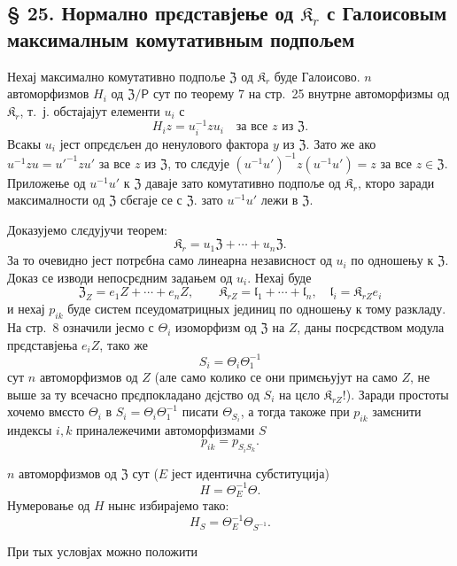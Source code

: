 \documentclass[11pt]{article}
\begin{document}
\subsection*{§ 25. Нормално прєдставјење од \(\mathfrak K_r\) с Галоисовым максималным комутативным подпољем\protect\footnotemark}
\label{normaldarstellung-von-r_r-mit-galoisschem-maximalem-kommutativem-teilkoerper-1}

Нехај максимално комутативно подпоље \(\mathfrak Z\) од \(\mathfrak K_r\) буде Галоисово. \(n\) автоморфизмов \(H_i\) од \(\mathfrak Z/\mathsf P\) сут по теорему 7 на стр.~25 внутрне автоморфизмы од \(\mathfrak K_r\), т.~ј. обстајајут елементи \(u_i\) с
\[
H_i z=u_i^{-1}zu_i\quad\text{за все }z\text{ из }\mathfrak Z.
\]
Всакы \(u_i\) јест опрєдєљен до ненулового фактора \(y\) из \(\mathfrak Z\). Зато же ако \(u^{-1}zu=u'^{-1}zu'\) за все \(z\) из \(\mathfrak Z\), то слєдује \((u^{-1}u')^{-1}z(u^{-1}u')=z\) за все \(z\in\mathfrak Z\). Приложење од \(u^{-1}u'\) к \(\mathfrak Z\) даваје зато комутативно подпоље од \(\mathfrak K_r\), кторо заради максималности од \(\mathfrak Z\) сбєгаје се с \(\mathfrak Z\). зато \(u^{-1}u'\) лежи в \(\mathfrak Z\).

Доказујемо слєдујучи теорем:
\[
\mathfrak K_r=u_1\mathfrak Z+\cdots+u_n\mathfrak Z.
\]
За то очевидно јест потрєбна само линеарна независност од \(u_i\) по одношењу к \(\mathfrak Z\). Доказ се изводи непосрєдним задањем од \(u_i\). Нехај буде
\[
\mathfrak Z_Z=e_1Z+\cdots+e_nZ,\qquad
\mathfrak K_{rZ}=\mathfrak l_1+\cdots+\mathfrak l_n,\quad
\mathfrak l_i=\mathfrak K_{rZ}e_i
\]
и нехај \(p_{ik}\) буде систем псеудоматрицных јединиц по одношењу к тому разкладу. На стр.~8 означили јесмо с \(\Theta_i\) изоморфизм од \(\mathfrak Z\) на \(Z\), даны посрєдством модула прєдставјења \(e_iZ\), тако же
\[
S_i=\Theta_i\Theta_1^{-1}
\]
сут \(n\) автоморфизмов од \(Z\) (але само колико се они примєњујут на само \(Z\), не выше за ту всечасно прєдпокладано дєјство од \(S_i\) на цєло \(\mathfrak K_{rZ}\)!). Заради простоты хочемо вмєсто \(\Theta_i\) в \(S_i=\Theta_i\Theta_1^{-1}\) писати \(\Theta_{S_i}\), а тогда такоже при \(p_{ik}\) замєнити индексы \(i,k\) приналежечими автоморфизмами \(S\)
\[
p_{ik}=p_{S_iS_k}.
\]

\(n\) автоморфизмов од \(\mathfrak Z\) сут (\(E\) јест идентична субституција)
\[
H=\Theta_E^{-1}\Theta.
\]
Нумеровање од \(H\) нынє избирајемо тако:
\[
H_S=\Theta_E^{-1}\Theta_{S^{-1}}.
\]

При тых условјах можно положити
\end{document}
